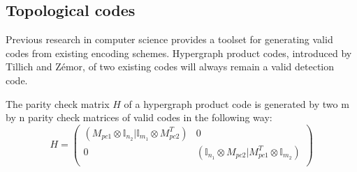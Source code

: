 \subsection{Topological codes}
Previous research in computer science 
provides a toolset for generating valid codes
from existing encoding schemes. 
Hypergraph product codes, introduced by Tillich and Z\'emor,
of two 
existing codes will always remain a valid detection code.

The parity check matrix $H$ of a hypergraph product code is generated
by two m by n parity check matrices of valid codes in the following
way:
\begin{equation}
	H = \left(\begin{array}{cc}
		\left(M_{pc1} \otimes \mathbb{I}_{n_2}| 
        \mathbb{I}_{m_1} \otimes M_{pc2}^T \right) & 0 \\
		0 & \left(\mathbb{I}_{n_1}\otimes 
        M_{pc2} | M_{pc1}^T \otimes \mathbb{I}_{m_2}\right)\\
	\end{array}\right)
\end{equation}






